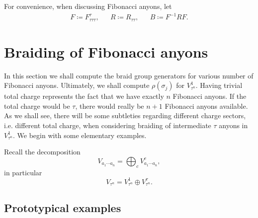 For convenience, when discussing Fibonacci anyons, let
\begin{equation}
  \begin{aligned}
    F \coloneqq F_{τττ}^τ, &&
    R \coloneqq R_{ττ}, &&
    B \coloneqq F^{-1} R F.
  \end{aligned}
\end{equation}



\section{Braiding of Fibonacci anyons}

In this section we shall compute the braid group generators for various number of Fibonacci anyons. Ultimately, we shall compute $ρ(σ_j)$ for $V_{τ^n}^1$. Having trivial total charge represents the fact that we have exactly $n$ Fibonacci anyons. If the total charge would be $τ$, there would really be $n+1$ Fibonacci anyons available. As we shall see, there will be some subtleties regarding different charge sectors, i.e. different total charge, when considering braiding of intermediate $τ$ anyons in $V_{τ^n}^1$. We begin with some elementary examples.

Recall the decomposition
\begin{equation}
  V_{a_1\cdots a_n} = \bigoplus_{c} V_{a_1 \cdots a_n}^c,
\end{equation}
in particular
\begin{equation}
  V_{τ^n} = V_{τ^n}^1 \oplus V_{τ^n}^τ.
\end{equation}


\subsection{Prototypical examples}

